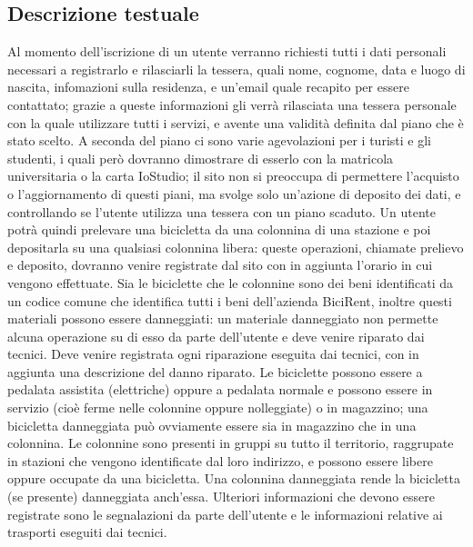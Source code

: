 \documentclass[a4paper,twoside]{article}
\begin{document}
\subsection{Descrizione testuale}
Al momento dell'iscrizione di un utente verranno richiesti tutti i dati personali necessari a registrarlo e rilasciarli la tessera, quali nome, cognome, data e luogo di nascita, infomazioni sulla residenza, e un'email quale recapito per essere contattato; grazie a queste informazioni gli verrà rilasciata una tessera personale con la quale utilizzare tutti i servizi, e avente una validità definita dal piano  che è stato scelto.\newline
A seconda del piano ci sono varie agevolazioni per i turisti e gli studenti, i quali però dovranno dimostrare di esserlo con la matricola universitaria o la carta IoStudio; il sito non si preoccupa di permettere l'acquisto o l'aggiornamento di questi piani, ma svolge solo un'azione di deposito dei dati, e controllando se l'utente utilizza una tessera con un piano scaduto.\newline
Un utente potrà quindi prelevare una bicicletta da una colonnina di una stazione e poi depositarla su una qualsiasi colonnina libera: queste operazioni, chiamate prelievo e deposito, dovranno venire registrate dal sito con in aggiunta l'orario in cui vengono effettuate.\newline
Sia le biciclette che le colonnine sono dei beni identificati da un codice comune che identifica tutti i beni dell'azienda BiciRent, inoltre questi materiali possono essere danneggiati: un materiale danneggiato non permette alcuna operazione su di esso da parte dell'utente e deve venire riparato dai tecnici.\newline
Deve venire registrata ogni riparazione eseguita dai tecnici, con in aggiunta una descrizione del danno riparato.\newline
Le biciclette possono essere a pedalata assistita (elettriche) oppure a pedalata normale e possono essere in servizio (cioè ferme nelle colonnine oppure nolleggiate) o in magazzino; una bicicletta danneggiata può ovviamente essere sia in magazzino che in una colonnina.\newline
Le colonnine sono presenti in gruppi su tutto il territorio, raggrupate in stazioni che vengono identificate dal loro indirizzo, e possono essere libere oppure occupate da una bicicletta. Una colonnina danneggiata rende la bicicletta (se presente) danneggiata anch'essa.\newline
Ulteriori informazioni che devono essere registrate sono le segnalazioni da parte dell'utente e le informazioni relative ai trasporti eseguiti dai tecnici.\newline
\end{document}
